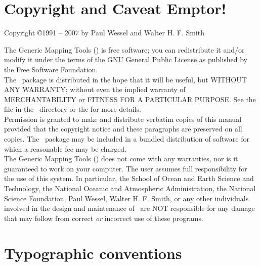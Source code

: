 
\chapter*{Copyright and Caveat Emptor!}

\begin{center}
Copyright \copyright 1991 -- 2007 by Paul Wessel and Walter H. F. Smith
\end{center}

\vspace{\baselineskip}

The Generic Mapping Tools (\GMT) is free software; you can redistribute
it and/or modify it under the terms of the GNU General Public License
as published by the Free Software Foundation. \\

The \GMT\ package is distributed in the hope that it will be useful, but
WITHOUT ANY WARRANTY; without even the implied warranty of
MERCHANTABILITY or FITNESS FOR A PARTICULAR PURPOSE.  See the
file  in the \GMT\ directory or the
for more details. \\

Permission is granted to make and distribute verbatim copies of this
manual provided that the copyright notice and these paragraphs are
preserved on all copies.  The \GMT\ package may be included in a bundled
distribution of software for which a reasonable fee may be charged. \\

The Generic Mapping Tools (\GMT) does not come with any warranties,
nor is it guaranteed to work on your computer.  The user assumes full
responsibility for the use of this system. In particular, the School of
Ocean and Earth Science and Technology, the National Oceanic and
Atmospheric Administration, the National Science Foundation,
Paul Wessel, Walter H. F. Smith, or any other individuals involved in
the design and maintenance of \GMT\ are NOT responsible for any damage
that may follow from correct \emph{or} incorrect use of these programs.


\chapter*{Typographic conventions}

